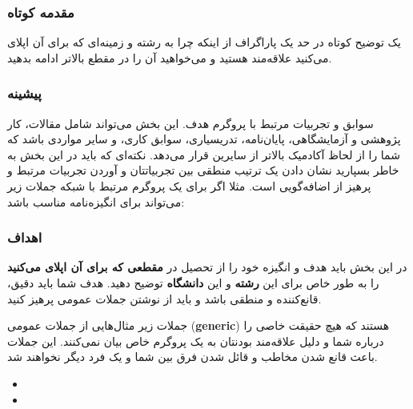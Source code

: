 \subsubsection{مقدمه کوتاه }
یک توضیح کوتاه در حد یک پاراگراف از اینکه چرا به رشته و زمینه‌ای که برای آن اپلای می‌کنید علاقه‌مند هستید و می‌خواهید آن را در مقطع بالاتر 
ادامه بدهید. 

\subsubsection{پیشینه }
سوابق و تجربیات مرتبط با پروگرم هدف. این بخش می‌تواند شامل مقالات، کار پژوهشی و آزمایشگاهی، پایان‌نامه، تدریسیاری، سوابق کاری، و سایر مواردی باشد که شما را 
از لحاظ آکادمیک بالاتر از سایرین قرار می‌دهد. نکته‌ای که باید در این بخش به خاطر بسپارید نشان دادن یک ترتیب منطقی بین تجربیاتتان و آوردن تجربیات مرتبط 
و پرهیز از اضافه‌گویی است. مثلا اگر برای یک پروگرم مرتبط با شبکه جملات زیر می‌تواند برای انگیزه‌نامه مناسب باشد:

\begin{framed}
\end{framed}


\subsubsection{اهداف }
در این بخش باید هدف و انگیزه خود را از تحصیل در \textbf{مقطعی که برای آن اپلای می‌کنید} را به طور خاص برای
این \textbf{رشته} و این \textbf{دانشگاه} توضیح دهید. هدف شما باید دقیق، قانع‌کننده و منطقی باشد و باید از نوشتن
جملات عمومی پرهیز کنید. 

\begin{warningbox}
  جملات زیر مثال‌هایی از جملات عمومی (\textbf{generic}) هستند که هیچ حقیقت خاصی را درباره شما و دلیل
  علاقه‌مند بودنتان به یک پروگرم خاص بیان نمی‌کنند. این جملات باعث قانع شدن مخاطب و قائل شدن فرق بین شما 
  و یک فرد دیگر نخواهند شد. 

  \begin{itemize}
    \item  {}
    \item {}
  \end{itemize}
\end{warningbox}

